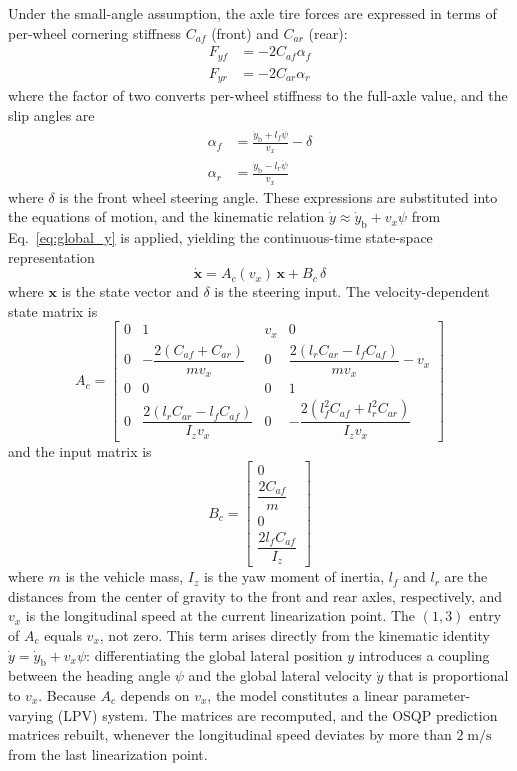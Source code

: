 \documentclass[12pt,a4paper,oneside]{report}
\begin{document}
Under the small-angle assumption, the axle tire forces are expressed in terms of
per-wheel cornering stiffness $C_{af}$ (front) and $C_{ar}$ (rear):
\begin{align}
F_{yf} &= -2 C_{af} \alpha_f \label{eq:front_tire} \\
F_{yr} &= -2 C_{ar} \alpha_r \label{eq:rear_tire}
\end{align}
where the factor of two converts per-wheel stiffness to the full-axle value, and the
slip angles are
\begin{align}
\alpha_f &= \frac{\dot{y}_{\text{b}} + l_f \dot{\psi}}{v_x} - \delta \label{eq:front_slip} \\
\alpha_r &= \frac{\dot{y}_{\text{b}} - l_r \dot{\psi}}{v_x} \label{eq:rear_slip}
\end{align}
where $\delta$ is the front wheel steering angle. These expressions are substituted into
the equations of motion, and the kinematic relation $\dot{y} \approx \dot{y}_{\text{b}} + v_x\psi$
from Eq.~\eqref{eq:global_y} is applied, yielding the continuous-time state-space
representation
\begin{equation}
\dot{\mathbf{x}} = A_c(v_x)\, \mathbf{x} + B_c\, \delta
\label{eq:lat_ss_continuous}
\end{equation}
where $\mathbf{x}$ is the state vector and $\delta$ is the steering input. The
velocity-dependent state matrix is
\begin{equation}
A_c = \begin{bmatrix}
0 & 1 & v_x & 0 \\[6pt]
0 & -\dfrac{2(C_{af}+C_{ar})}{m v_x} & 0 &
    \dfrac{2(l_r C_{ar} - l_f C_{af})}{m v_x} - v_x \\[6pt]
0 & 0 & 0 & 1 \\[6pt]
0 & \dfrac{2(l_r C_{ar} - l_f C_{af})}{I_z v_x} & 0 &
   -\dfrac{2(l_f^2 C_{af} + l_r^2 C_{ar})}{I_z v_x}
\end{bmatrix}
\label{eq:Ac_lat}
\end{equation}
and the input matrix is
\begin{equation}
B_c = \begin{bmatrix} 0 \\[4pt] \dfrac{2 C_{af}}{m} \\[4pt] 0 \\[4pt]
\dfrac{2 l_f C_{af}}{I_z} \end{bmatrix}
\label{eq:Bc_lat}
\end{equation}
where $m$ is the vehicle mass, $I_z$ is the yaw moment of inertia, $l_f$ and $l_r$
are the distances from the center of gravity to the front and rear axles, respectively,
and $v_x$ is the longitudinal speed at the current linearization point. The
$(1,3)$ entry of $A_c$ equals $v_x$, not zero. This term arises directly from the
kinematic identity $\dot{y} = \dot{y}_{\text{b}} + v_x\psi$: differentiating the global
lateral position $y$ introduces a coupling between the heading angle $\psi$ and the
global lateral velocity $\dot{y}$ that is proportional to $v_x$. Because $A_c$ depends
on $v_x$, the model constitutes a linear parameter-varying (LPV) system. The matrices
are recomputed, and the OSQP prediction matrices rebuilt, whenever the longitudinal
speed deviates by more than $2\;\mathrm{m/s}$ from the last linearization point.
\end{document}
